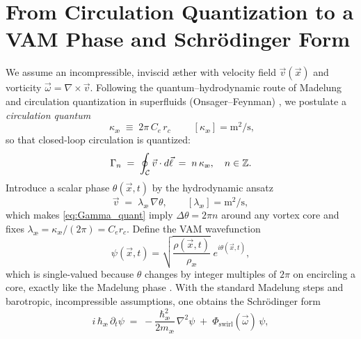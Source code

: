 \documentclass[a4paper,12pt]{article}
\begin{document}

    \section{From Circulation Quantization to a VAM Phase and Schrödinger Form}
    \label{sec:circulation_to_phase}

    We assume an incompressible, inviscid æther with velocity field $\vec v(\vec x)$ and vorticity $\vec\omega=\nabla\times\vec v$. Following the quantum–hydrodynamic route of Madelung \cite{Madelung1927} and circulation quantization in superfluids (Onsager--Feynman) \cite{Onsager1949,Feynman1955}, we postulate a \emph{circulation quantum}
    \begin{equation}
        \boxed{\;\kappa_\text{\ae}\;\equiv\;2\pi\,C_e\,r_c\;}\qquad [\kappa_\text{\ae}] = \text{m}^2/\text{s},
        \label{eq:kappa_def}
    \end{equation}
    so that closed-loop circulation is quantized:
    \begin{equation}
        \Gamma_n \;=\; \oint_{\cal C} \vec v \cdot d\vec\ell \;=\; n\,\kappa_\text{\ae},\quad n\in\mathbb Z.
        \label{eq:Gamma_quant}
    \end{equation}
    Introduce a scalar phase $\theta(\vec x,t)$ by the hydrodynamic ansatz
    \begin{equation}
        \vec v \;=\; \lambda_\text{\ae}\,\nabla\theta,\qquad [\lambda_\text{\ae}] = \text{m}^2/\text{s},
    \end{equation}
    which makes \eqref{eq:Gamma_quant} imply $\Delta\theta=2\pi n$ around any vortex core and fixes $\lambda_\text{\ae}=\kappa_\text{\ae}/(2\pi)=C_e r_c$. Define the VAM wavefunction
    \begin{equation}
        \psi(\vec x,t)=\sqrt{\frac{\rho(\vec x,t)}{\rho_\text{\ae}}}\;e^{i\theta(\vec x,t)},
    \end{equation}
    which is single-valued because $\theta$ changes by integer multiples of $2\pi$ on encircling a core, exactly like the Madelung phase \cite{Madelung1927}. With the standard Madelung steps and barotropic, incompressible assumptions, one obtains the Schrödinger form
    \begin{equation}
        i\,\hbar_\text{\ae}\,\partial_t \psi \;=\; -\frac{\hbar_\text{\ae}^2}{2m_\text{\ae}}\,\nabla^2\psi \;+\; \Phi_\text{swirl}(\vec\omega)\,\psi,
        \label{eq:schrod_ae}
    \end{equation}
\end{document}
